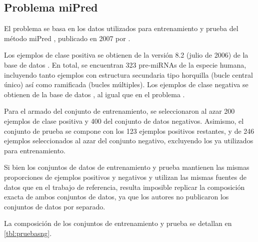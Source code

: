 \subsection{Problema miPred}
El problema  se basa en los datos utilizados para
entrenamiento y prueba del método miPred \cite{ng}, publicado en 2007
por \citeauthor{ng}.

Los ejemplos de clase positiva se obtienen de la versión 8.2 (julio de
2006) de la base de datos . En total, se encuentran 323
pre-miRNAs de la especie humana, incluyendo tanto ejemplos con
estructura secundaria tipo horquilla (bucle central único) así como
ramificada (bucles múltiples).  Los ejemplos de clase negativa se
obtienen de la base de datos , al igual que en el problema
\tripletsvm{}.

Para el armado del conjunto de entrenamiento, se seleccionaron al azar
200 ejemplos de clase positiva y 400 del conjunto de datos negativos.
Asimismo, el conjunto de prueba se compone con los 123 ejemplos
positivos restantes, y de 246 ejemplos seleccionados al azar del
conjunto negativo, excluyendo los ya utilizados para entrenamiento.

Si bien los conjuntos de datos de entrenamiento y prueba mantienen las
mismas proporciones de ejemplos positivos y negativos y utilizan las
mismas fuentes de datos que en el trabajo de referencia, resulta
imposible replicar la composición exacta de ambos conjuntos de datos,
ya que los autores no publicaron los conjuntos de datos por separado.

La composición de los conjuntos de entrenamiento y prueba se detallan
en \autoref{tbl:pruebasng}.